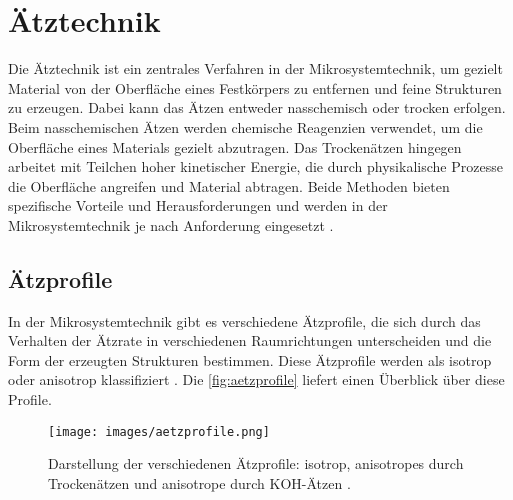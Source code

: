 \documentclass{article} %
\newcommand*\circled[1]{\tikz[baseline=(char.base)]{\node[shape=circle, draw, inner sep=1pt, text height=1.5ex, text depth=.25ex] (char) {#1};}}
\begin{document}
 





\clearpage
\section{Ätztechnik}

Die Ätztechnik ist ein zentrales Verfahren in der Mikrosystemtechnik, um gezielt Material von der Oberfläche eines Festkörpers zu entfernen und feine Strukturen zu erzeugen. Dabei kann das Ätzen entweder nasschemisch oder trocken erfolgen. Beim nasschemischen Ätzen werden chemische Reagenzien verwendet, um die Oberfläche eines Materials gezielt abzutragen. Das Trockenätzen hingegen arbeitet mit Teilchen hoher kinetischer Energie, die durch physikalische Prozesse die Oberfläche angreifen und Material abtragen. Beide Methoden bieten spezifische Vorteile und Herausforderungen und werden in der Mikrosystemtechnik je nach Anforderung eingesetzt \cite{schmid2024Aetzen}.




\subsection{Ätzprofile}

In der Mikrosystemtechnik gibt es verschiedene Ätzprofile, die sich durch das Verhalten der Ätzrate in verschiedenen Raumrichtungen unterscheiden und die Form der erzeugten Strukturen bestimmen. Diese Ätzprofile werden als isotrop oder anisotrop klassifiziert \cite{schmid2024Aetzen}. Die \autoref{fig:aetzprofile} liefert einen Überblick über diese Profile. 

\begin{figure}[htb!]
    \centering
    \texttt{[image: images/aetzprofile.png]} %
    \captionsetup{labelfont=bf, width=.85\textwidth} %
    \caption{Darstellung der verschiedenen Ätzprofile: \protect\circled{1} isotrop, \protect\circled{2} anisotropes durch Trockenätzen und \protect\circled{3} anisotrope durch KOH-Ätzen \cite{schmid2024Aetzen}.}
    \label{fig:aetzprofile}
\end{figure}
\end{document}
